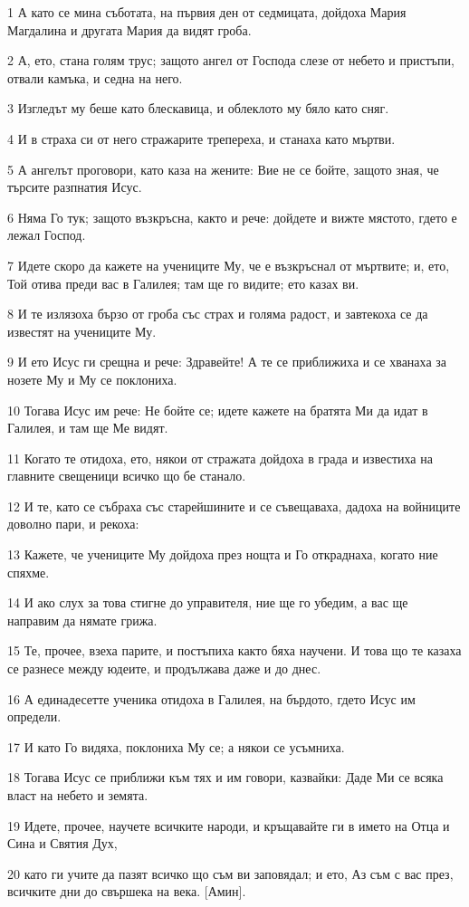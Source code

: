 \par 1 А като се мина съботата, на първия ден от седмицата, дойдоха Мария Магдалина и другата Мария да видят гроба.
\par 2 А, ето, стана голям трус; защото ангел от Господа слезе от небето и пристъпи, отвали камъка, и седна на него.
\par 3 Изгледът му беше като блескавица, и облеклото му бяло като сняг.
\par 4 И в страха си от него стражарите трепереха, и станаха като мъртви.
\par 5 А ангелът проговори, като каза на жените: Вие не се бойте, защото зная, че търсите разпнатия Исус.
\par 6 Няма Го тук; защото възкръсна, както и рече: дойдете и вижте мястото, гдето е лежал Господ.
\par 7 Идете скоро да кажете на учениците Му, че е възкръснал от мъртвите; и, ето, Той отива преди вас в Галилея; там ще го видите; ето казах ви.
\par 8 И те излязоха бързо от гроба със страх и голяма радост, и завтекоха се да известят на учениците Му.
\par 9 И ето Исус ги срещна и рече: Здравейте! А те се приближиха и се хванаха за нозете Му и Му се поклониха.
\par 10 Тогава Исус им рече: Не бойте се; идете кажете на братята Ми да идат в Галилея, и там ще Ме видят.
\par 11 Когато те отидоха, ето, някои от стражата дойдоха в града и известиха на главните свещеници всичко що бе станало.
\par 12 И те, като се събраха със старейшините и се съвещаваха, дадоха на войниците доволно пари, и рекоха:
\par 13 Кажете, че учениците Му дойдоха през нощта и Го откраднаха, когато ние спяхме.
\par 14 И ако слух за това стигне до управителя, ние ще го убедим, а вас ще направим да нямате грижа.
\par 15 Те, прочее, взеха парите, и постъпиха както бяха научени. И това що те казаха се разнесе между юдеите, и продължава даже и до днес.
\par 16 А единадесетте ученика отидоха в Галилея, на бърдото, гдето Исус им определи.
\par 17 И като Го видяха, поклониха Му се; а някои се усъмниха.
\par 18 Тогава Исус се приближи към тях и им говори, казвайки: Даде Ми се всяка власт на небето и земята.
\par 19 Идете, прочее, научете всичките народи, и кръщавайте ги в името на Отца и Сина и Святия Дух,
\par 20 като ги учите да пазят всичко що съм ви заповядал; и ето, Аз съм с вас през, всичките дни до свършека на века. [Амин].

